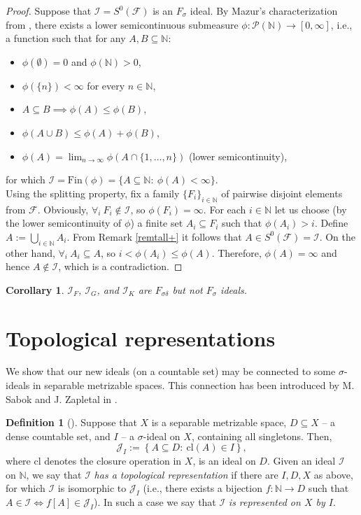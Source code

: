 \documentclass{amsart}
\newtheorem{cor}[thm]{Corollary}
\theoremstyle{definition}
\newtheorem{df}[thm]{Definition}
\newcommand{\N}{{\mathbb N}}
\newcommand{\Fin}{\textrm{Fin}}
\newcommand{\I}{\mathcal I}
\newcommand{\MB}{S^0}
\newcommand{\cl}{\mathrm{cl}}
\begin{document}
\begin{proof}
Suppose that $\I=\MB(\mathcal{F})$ is an $F_\sigma$ ideal.
By Mazur's characterization from \cite{Maz}, there exists a lower semicontinuous submeasure $\phi\colon\mathcal{P}(\N)\to [0, \infty]$, i.e., a function such that for any $A,B\subseteq\N$:
\begin{itemize}
\item $\phi(\emptyset)=0$ and $\phi(\N)>0$,
\item $\phi(\{n\})<\infty$ for every $n\in\N$,
\item $A\subseteq B \implies\phi(A)\leq \phi(B)$,
\item $\phi(A\cup B) \leq \phi(A) + \phi(B)$,
\item \label{continuity-condition} $\phi(A)=\lim_{n\to\infty} \phi(A \cap \{1,\ldots,n\})$ (lower semicontinuity),
\end{itemize}
for which $\I= \Fin(\phi)=\{A\subseteq \N :\ \phi(A)<\infty\}$.\\
Using the splitting property, fix a family $\{F_i\}_{i\in\N}$ of pairwise disjoint elements from $\mathcal{F}$.
Obviously, $\forall_{i}\ F_i\notin\I$, so $\phi(F_i)=\infty$. For each $i\in\N$ let us choose (by the lower semicontinuity of $\phi$) a finite set $A_i\subseteq F_i$ such that $\phi(A_i)>i$. Define $A:=\bigcup_{i\in\N}{A_i}$. From Remark \ref{remtall+} it follows that $A\in S^0(\mathcal{F}) = \I$. On the other hand, $\forall_{i}\ A_i \subseteq A$, so $i<\phi(A_i)\leq \phi(A)$. Therefore, $\phi(A)=\infty$ and hence $A\notin\I$, which is a contradiction.
\end{proof}

\begin{cor}
$\I_F$, $\I_G$, and $\I_K$ are $F_{\sigma\delta}$ but not $F_{\sigma}$ ideals.
\end{cor}


\section{Topological representations}

We show that our new ideals (on a countable set) may be connected to some $\sigma$-ideals in separable metrizable spaces. This connection has been introduced by M. Sabok and J. Zapletal in \cite{Sabok}. 

\begin{df}[\cite{Sabok}]
Suppose that $X$ is a separable metrizable space, $D\subseteq X$ -- a dense countable set, and $I$ -- a $\sigma$-ideal on $X$, containing all singletons. Then,
$$\mathcal{J}_I:=\left\{A\subseteq D :\ \cl(A)\in I\right\},$$
where $\cl$ denotes the closure operation in $X$,
is an ideal on $D$. Given an ideal $\mathcal{I}$ on $\N$, we say that $\mathcal{I}$ \emph{has a topological representation} if there are $I,D,X$ as above, for which $\mathcal{I}$ is isomorphic to $\mathcal{J}_I$ (i.e., there exists a bijection $f\colon \N\to D$ such that $A\in\I \Leftrightarrow f[A]\in\mathcal{J}_I$). In such a case we say that $\mathcal{I}$ \emph{is represented on $X$ by $I$}.
\end{df}
\end{document}
